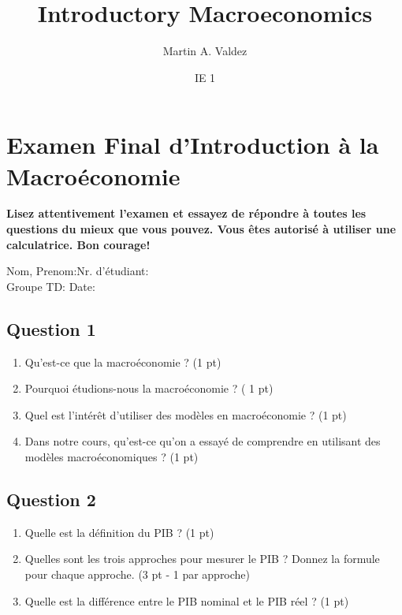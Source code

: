 \documentclass[11pt]{article}
\title{Introductory Macroeconomics}
\author{Martin A. Valdez}
\date{IE 1\\}
\begin{document}

\section*{Examen Final d'Introduction à la Macroéconomie}
\textbf{Lisez attentivement l'examen et essayez de répondre à toutes les questions du mieux que vous 
pouvez. 
Vous êtes autorisé à utiliser une calculatrice. Bon courage!}


\begin{flushleft}

Nom, Prenom:\underline{\hspace{5cm}}\hfil Nr. d'étudiant:\underline{\hspace{4cm}}\\
Groupe TD:\underline{\hspace{5cm}} \hfill Date:\underline{\hspace{5cm}}


\end{flushleft}
\subsection*{Question 1}

\begin{enumerate}
    \item Qu'est-ce que la macroéconomie ? (1 pt)
    \item Pourquoi étudions-nous la macroéconomie ? ( 1 pt)
    \item Quel est l'intérêt d'utiliser des modèles en macroéconomie ? (1 pt)
    \item Dans notre cours, qu'est-ce qu'on a essayé de comprendre en utilisant des modèles macroéconomiques ? (1 pt) 
\end{enumerate}

\subsection*{Question 2}
\begin{enumerate}
    \item Quelle est la définition du PIB ? (1 pt)
    \item Quelles sont les trois approches pour mesurer le PIB ? Donnez la formule pour chaque approche. (3 pt - 1 par approche)
    \item Quelle est la différence entre le PIB nominal et le PIB réel ? (1 pt)
\end{enumerate}
\end{document}
